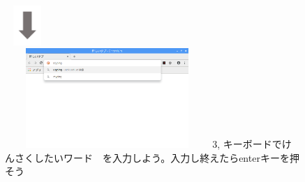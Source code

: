 \documentclass[a4paper,12pt]{jarticle}
\begin{document}
\begin{figure}[t]
  \hfill\begin{minipage}{7.78cm}
    {\centering
      \includegraphics[width=1.707cm,height=1.505cm]{textbook-img074.png}
    }\\
    \includegraphics[width=7.742cm,height=3.771cm]{textbook-img072.png}
    3,
    キーボードでけんさくしたいワード　を入力しよう。入力し終えたらenterキーを押そう
  \end{minipage}

  \vspace{70mm}

\end{figure}
\clearpage
\end{document}
